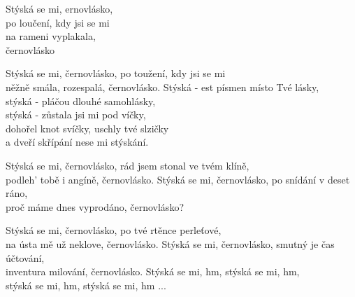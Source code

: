 \ve
{}Stýská se mi, ernovlásko, \\
po loučení, kdy jsi se mi \\
na rameni vyplakala, \\
černovlásko 

Stýská se mi, černovlásko, po toužení, kdy jsi se mi\\
něžně smála, rozespalá, černovlásko.\cho
{}Stýská - est písmen místo Tvé lásky,\\ 
stýská - pláčou dlouhé samohlásky,\\
stýská - zůstala jsi mi pod víčky,\\
dohořel knot svíčky, uschly tvé slzičky \\
a dveří skřípání nese mi stýskání. 

\ve
Stýská se mi, černovlásko, rád jsem stonal ve tvém klíně, \\
podleh' tobě i angíně, černovlásko. 
\ve
Stýská se mi, černovlásko, po snídání v deset ráno, \\
proč máme dnes vyprodáno, černovlásko? 

\ve
Stýská se mi, černovlásko, po tvé rtěnce perleťové, \\
na ústa mě už neklove, černovlásko. 
\ve
Stýská se mi, černovlásko, smutný je čas účtování, \\
inventura milování, černovlásko.
\re{*:}Stýská se mi, hm, stýská se mi, hm,\\
stýská se mi, hm, stýská se mi, hm ...
\esong
